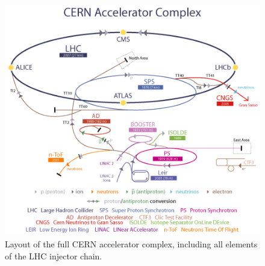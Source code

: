 \begin{figure}[!t]
\centering
\includegraphics[width=12cm]{FigCap3/CERN_Accl_Complex.png}
\caption{Layout of the full CERN accelerator complex, including all elements of the LHC injector chain.}
\label{fig:imageLHC}
\end{figure} 
